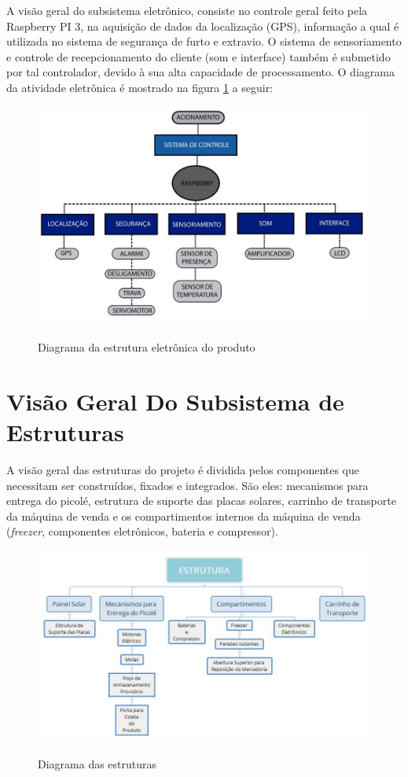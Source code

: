 A visão geral do subsistema eletrônico, consiste no controle geral feito pela Raspberry PI 3, na aquisição de dados da localização (GPS), informação a qual é utilizada no sistema de segurança de furto e extravio. O sistema de sensoriamento e controle de recepcionamento do cliente (som e interface) também é submetido por tal controlador, devido à sua alta capacidade de processamento. O diagrama da atividade eletrônica é mostrado na figura \ref{fig:diagrama} a seguir:

\begin{figure}[H]
	\centering
    \caption{Diagrama da estrutura eletrônica do produto}
    \includegraphics[width=1.05\textwidth]{figuras/diagrama}
    \label{fig:diagrama}
\end{figure}


\section{Visão Geral Do Subsistema de Estruturas}

A visão geral das estruturas do projeto é dividida pelos componentes que necessitam ser construídos, fixados e integrados. São eles: mecanismos para entrega do picolé, estrutura de suporte das placas solares, carrinho de transporte da máquina de venda e os compartimentos internos da máquina de venda (\textit{freezer}, componentes eletrônicos, bateria e compressor).

\begin{figure}[H]
	\centering
    \caption{Diagrama das estruturas}
    \includegraphics[width=\textwidth]{figuras/visao_geral_estrutura}
    \label{fig:visao_geral_estrutura}
\end{figure}

